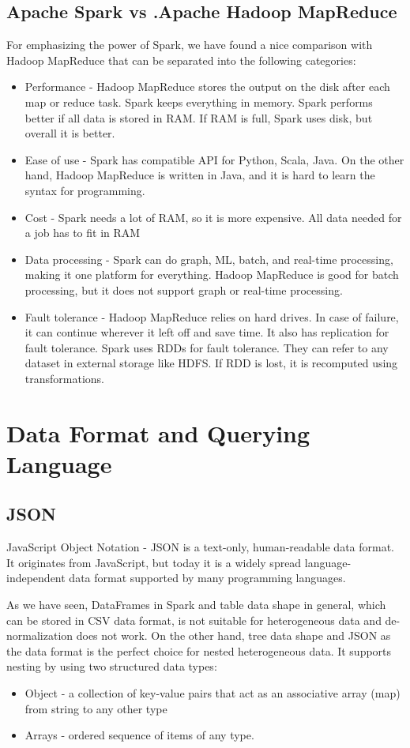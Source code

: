 \subsection{Apache Spark vs .Apache Hadoop MapReduce}
For emphasizing the power of Spark, we have found a nice comparison with Hadoop MapReduce that can be separated into the following categories: 
\begin{itemize}
	\item Performance - Hadoop MapReduce stores the output on the disk after each map or reduce task. Spark keeps everything in memory. Spark performs better if all data is stored in RAM. If RAM is full, Spark uses disk, but overall it is better.
	\item Ease of use - Spark has compatible API for Python, Scala, Java. On the other hand, Hadoop MapReduce is written in Java, and it is hard to learn the syntax for programming. 
	\item Cost - Spark needs a lot of RAM, so it is more expensive. All data needed for a job has to fit in RAM
	\item Data processing - Spark can do graph, ML, batch, and real-time processing, making it one platform for everything. Hadoop MapReduce is good for batch processing, but it does not support graph or real-time processing. 
	\item Fault tolerance - Hadoop MapReduce relies on hard drives. In case of failure, it can continue wherever it left off and save time. It also has replication for fault tolerance. Spark uses RDDs for fault tolerance. They can refer to any dataset in external storage like HDFS. If RDD is lost, it is recomputed using transformations.
\end{itemize}

\section{Data Format and Querying Language}
\subsection{JSON}
\label{sec:JSON}
JavaScript Object Notation - JSON \cite{JSON} is a text-only, human-readable data format. It originates from JavaScript, but today it is a widely spread language-independent data format supported by many programming languages. 

As we have seen, DataFrames in Spark and table data shape in general, which can be stored in CSV data format, is not suitable for heterogeneous data and de-normalization does not work. On the other hand, tree data shape and JSON as the data format is the perfect choice for nested heterogeneous data. It supports nesting by using two structured data types:
\begin{itemize}
	\item Object - a collection of key-value pairs that act as an associative array (map) from string to any other type 
	\item Arrays - ordered sequence of items of any type. 
\end{itemize} 

